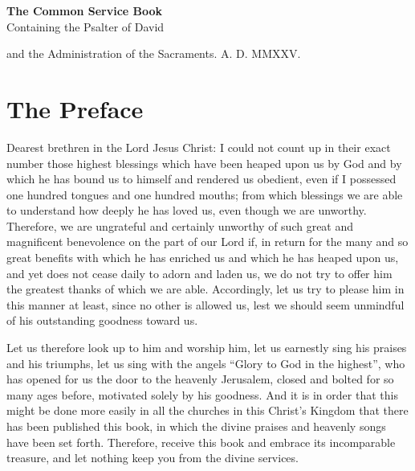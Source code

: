 \documentclass[14pt,openany]{book}
\begin{document}
	\begin{titlepage}
		\vspace*{\fill}
		\begin{center}
			{\Huge\bfseries The Common Service Book}\\[1cm]
			{\Large Containing the Psalter of David}\par
			{\Large and the Administration of the Sacraments.}
			\vfill
			{A. D. \textcolor{rubric}{MMXXV}}.
		\end{center}
	\end{titlepage}

	\clearpage
	
	\tableofcontents
	
	\clearpage
	
	\chapter{The Preface}
	
		Dearest brethren in the Lord Jesus Christ: I could not count up in their exact number those highest blessings which have been heaped upon us by God and by which he has bound us to himself and rendered us obedient, even if I possessed one hundred tongues and one hundred mouths; from which blessings we are able to understand how deeply he has loved us, even though we are unworthy. Therefore, we are ungrateful and certainly unworthy of such great and magnificent benevolence on the part of our Lord if, in return for the many and so great benefits with which he has enriched us and which he has heaped upon us, and yet does not cease daily to adorn and laden us, we do not try to offer him the greatest thanks of which we are able. Accordingly, let us try to please him in this manner at least, since no other is allowed us, lest we should seem unmindful of his outstanding goodness toward us. 
		
		Let us therefore look up to him and worship him, let us earnestly sing his praises and his triumphs, let us sing with the angels \enquote{Glory to God in the highest}, who has opened for us the door to the heavenly Jerusalem, closed and bolted for so many ages before, motivated solely by his goodness. And it is in order that this might be done more easily in all the churches in this Christ's Kingdom that there has been published this book, in which the divine praises and heavenly songs have been set forth. Therefore, receive this book and embrace its incomparable treasure, and let nothing keep you from the divine services.
		
\end{document}
